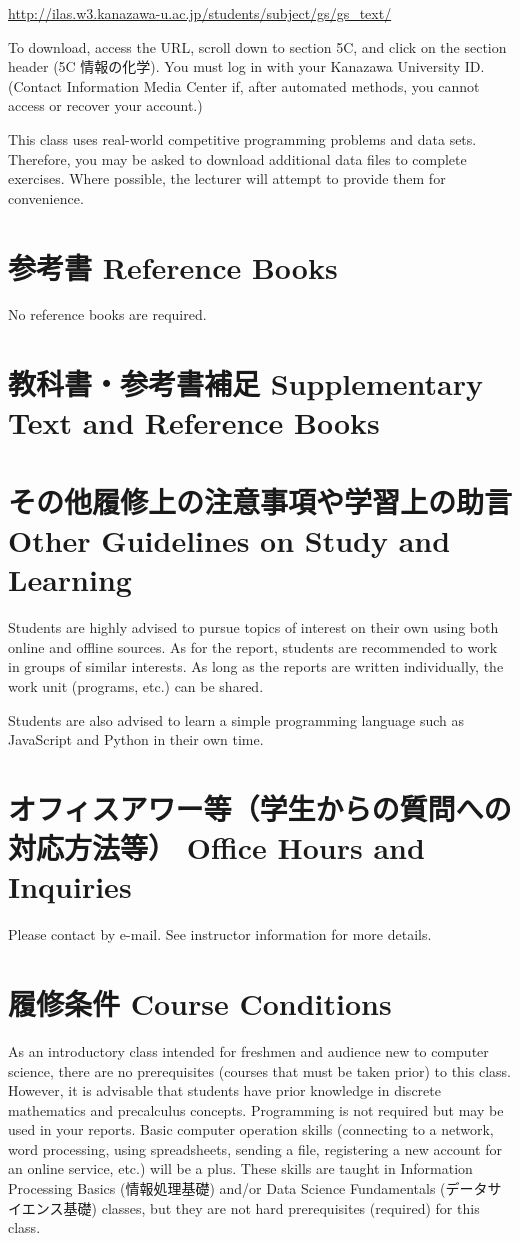 \documentclass[a4paper]{article}
\begin{document}
\url{http://ilas.w3.kanazawa-u.ac.jp/students/subject/gs/gs_text/}

To download, access the URL, scroll down to section 5C, and click on the section header (5C 情報の化学). You must log in with your Kanazawa University ID. (Contact Information Media Center if, after automated methods, you cannot access or recover your account.)

This class uses real-world competitive programming problems and data sets. Therefore, you may be asked to download additional data files to complete exercises. Where possible, the lecturer will attempt to provide them for convenience.

\section{参考書 Reference Books}
No reference books are required.

\section{教科書・参考書補足 Supplementary Text and Reference Books}

\section{その他履修上の注意事項や学習上の助言 Other Guidelines on Study and Learning}
Students are highly advised to pursue topics of interest on their own using both online and offline sources. As for the report, students are recommended to work in groups of similar interests. As long as the reports are written individually, the work unit (programs, etc.) can be shared.

Students are also advised to learn a simple programming language such as JavaScript and Python in their own time.

\section{オフィスアワー等（学生からの質問への対応方法等） Office Hours and Inquiries}
Please contact by e-mail. See instructor information for more details.

\section{履修条件 Course Conditions}
As an introductory class intended for freshmen and audience new to computer science, there are no prerequisites (courses that must be taken prior) to this class. However, it is advisable that students have prior knowledge in discrete mathematics and precalculus concepts. Programming is not required but may be used in your reports. Basic computer operation skills (connecting to a network, word processing, using spreadsheets, sending a file, registering a new account for an online service, etc.) will be a plus. These skills are taught in Information Processing Basics (情報処理基礎) and/or Data Science Fundamentals (データサイエンス基礎) classes, but they are not hard prerequisites (required) for this class.
\end{document}
